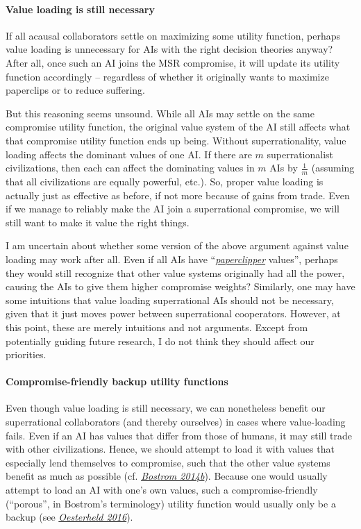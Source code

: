 \paragraph{Value loading is still
necessary}\label{value-loading-is-still-necessary}

If all acausal collaborators settle on maximizing some utility function,
perhaps value loading is unnecessary for AIs with the right decision
theories anyway? After all, once such an AI joins the MSR compromise, it
will update its utility function accordingly -- regardless of whether it
originally wants to maximize paperclips or to reduce suffering.

But this reasoning seems unsound. While all AIs may settle on the same
compromise utility function, the original value system of the AI still
affects what that compromise utility function ends up being. Without
superrationality, value loading affects the dominant values of one AI.
If there are \(m\) superrationalist civilizations, then each can affect
the dominating values in \(m\) AIs by \(\frac{1}{m}\) (assuming that all
civilizations are equally powerful, etc.). So, proper value loading is
actually just as effective as before, if not more because of gains from
trade. Even if we manage to reliably make the AI join a superrational
compromise, we will still want to make it value the right things.

I am uncertain about whether some version of the above argument against
value loading may work after all. Even if all AIs have
``\href{https://wiki.lesswrong.com/wiki/Paperclip_maximizer}{\emph{paperclipper}}
values'', perhaps they would still recognize that other value systems
originally had all the power, causing the AIs to give them higher
compromise weights? Similarly, one may have some intuitions that value
loading superrational AIs should not be necessary, given that it just
moves power between superrational cooperators. However, at this point,
these are merely intuitions and not arguments. Except from potentially
guiding future research, I do not think they should affect our
priorities.

\hypertarget{compromise-friendly-backup-utility-functions}{\paragraph{Compromise-friendly
backup utility
functions}\label{compromise-friendly-backup-utility-functions}}

Even though value loading is still necessary, we can nonetheless benefit
our superrational collaborators (and thereby ourselves) in cases where
value-loading fails. Even if an AI has values that differ from those of
humans, it may still trade with other civilizations. Hence, we should
attempt to load it with values that especially lend themselves to
compromise, such that the other value systems benefit as much as
possible (cf.
\href{http://www.nickbostrom.com/papers/porosity.pdf}{\emph{Bostrom
2014b}}). Because one would usually attempt to load an AI with one's own
values, such a compromise-friendly (``porous'', in Bostrom's
terminology) utility function would usually only be a backup (see
\href{https://foundational-research.org/files/backup-utility-functions.pdf}{\emph{Oesterheld
2016}}).

